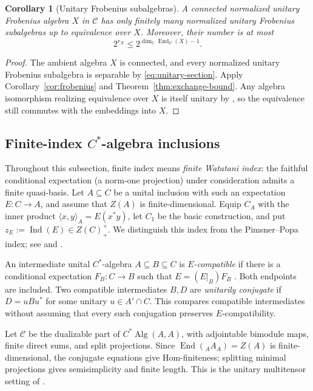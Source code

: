 \documentclass[11pt]{amsart}
\newtheorem{corollary}[theorem]{Corollary}
\theoremstyle{definition}
\theoremstyle{remark}
\newcommand{\C}{\mathcal C}
\newcommand{\CC}{\mathbb C}
\DeclareMathOperator{\End}{End}
\begin{document}
\begin{corollary}[Unitary Frobenius subalgebras]
\label{cor:unitary-frobenius-subalgebra}
A connected normalized unitary Frobenius algebra $X$ in $\C$ has only
finitely many normalized unitary Frobenius subalgebras up to equivalence
over $X$.
Moreover, their number is at most
\[
  2^{r_X}\leq 2^{\dim_{\CC}\End_{\C}(X)-1}.
\]
\end{corollary}

\begin{proof}
The ambient algebra $X$ is connected, and every normalized unitary
Frobenius subalgebra is separable by \eqref{eq:unitary-section}.
Apply Corollary~\ref{cor:frobenius} and
Theorem~\ref{thm:exchange-bound}.  Any algebra isomorphism realizing
equivalence over $X$ is itself unitary by \cite[Theorem~3.9]{CGGH},
so the equivalence still commutes with the embeddings into $X$.
\end{proof}

\subsection{Finite-index $C^*$-algebra inclusions}

Throughout this subsection, finite index means \emph{finite Watatani
index}: the faithful conditional expectation (a norm-one projection)
under consideration admits a finite quasi-basis.  Let $A\subseteq C$ be a unital inclusion with such an
expectation $E:C\to A$, and assume that $Z(A)$ is finite-dimensional.
Equip $C_A$ with the inner product $\langle x,y\rangle_A=E(x^*y)$,
let $C_1$ be the basic construction, and put
$z_E:=\operatorname{Ind}(E)\in Z(C)_+^\times$.
We distinguish this index from the Pimsner--Popa index; see
\cite[Example~3.10 and the paragraph following Lemma~3.11]{CHPJP}
and \cite{WatataniIndex}.

An intermediate unital $C^*$-algebra $A\subseteq B\subseteq C$ is
\emph{$E$-compatible} if there is a conditional expectation $F_B:C\to B$
such that $E=(E|_B)F_B$
\cite[Definition~10.4]{GhoshPalcouxLattices}.  Both endpoints are included.
Two compatible intermediates $B,D$ are \emph{unitarily conjugate} if
$D=uBu^*$ for some unitary $u\in A'\cap C$.  This compares compatible
intermediates without assuming that every such conjugation preserves
$E$-compatibility.

Let $\C$ be the dualizable part of $C^*\!\operatorname{Alg}(A,A)$,
with adjointable bimodule maps, finite direct sums, and split projections.
Since $\End({}_AA_A)=Z(A)$ is finite-dimensional, the conjugate equations
give Hom-finiteness; splitting minimal projections gives semisimplicity
and finite length.  This is the unitary multitensor setting of
\cite[Lemma~3.11 and Remark~3.13]{CHPJP}.
\end{document}
